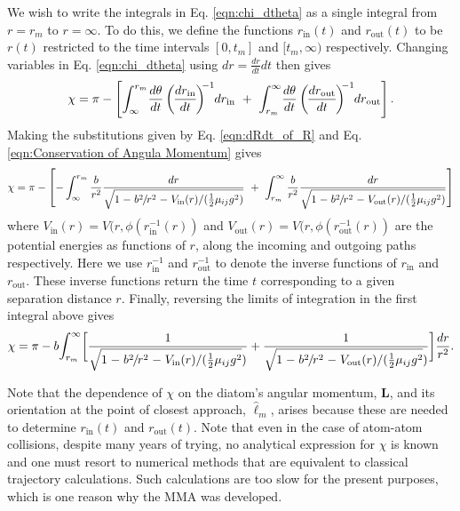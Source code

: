 \documentclass[article]{revtex4-2}
\begin{document}
We wish to write the integrals in Eq. \ref{eqn:chi_dtheta} as a single integral from $r=r_m$ to $r=\infty$. To do this, we define the functions $r_{\text{in}}(t)$ and $r_{\text{out}}(t)$ to be $r(t)$ restricted to the time intervals $[0, t_m]$ and  $[t_m, \infty)$ respectively. Changing variables in Eq. \ref{eqn:chi_dtheta} using $dr = \frac{dr}{dt}dt$ then gives
\begin{equation}
    \chi = \pi - \left[ \int_{\infty}^{r_m}\!\frac{d \theta }{dt}\left(\mkern-2mu \frac{dr_{\text{in}}}{dt}\mkern-2mu \right)^{\!\!-1}\mkern-4mu dr_{\text{in}} \ + \  \int_{r_m}^{\infty}\!\frac{d \theta }{dt}\left(\mkern-2mu \frac{dr_{\text{out}}}{dt}\mkern-2mu \right)^{\!\!-1}\mkern-4mu dr_{\text{out}}\right].
\end{equation}
Making the substitutions given by Eq. \ref{eqn:dRdt_of_R} and Eq. \ref{eqn:Conservation of Angula Momentum} gives
\begin{equation}
    \chi = \pi - \left[ -\int_{\infty}^{r_m} \frac{b}{r^2}\frac{dr}{\sqrt{1 \mkern1mu - \mkern1mu  b^2 \mkern-2mu/\mkern-2mu r^2 \mkern1mu - \mkern1mu V_{\text{in}}(r)/(\frac{1}{2}\mu_{ij} g^2)}} \ + \ \int_{r_m}^{\infty} \frac{b}{r^2}\frac{dr}{\sqrt{1 \mkern1mu - \mkern1mu  b^2 \mkern-2mu/\mkern-2mu r^2 \mkern1mu - \mkern1mu V_{\text{out}}(r)/(\frac{1}{2}\mu_{ij} g^2)}} \right]
\end{equation}
where $V_{\text{in}}(r) = V(r, \phi(r_{\text{in}}^{-1}(r))$ and $V_{\text{out}}(r) = V(r, \phi(r_{\text{out}}^{-1}(r))$ are the potential energies as functions of $r$, along the incoming and outgoing paths respectively. Here we use $r_{\text{in}}^{-1}$ and $r_{\text{out}}^{-1}$ to denote the inverse functions of $r_{\text{in}}$ and $r_{\text{out}}$. These inverse functions return the time $t$ corresponding to    a given separation distance $r$. Finally, reversing the limits of integration in the first integral above gives
\begin{equation}
    \chi = \pi - b \mathlarger{\int}_{r_m}^{\infty} \bigg[ \frac{1}{\sqrt{1 \mkern1mu - \mkern1mu  b^2 \mkern-2mu/\mkern-2mu r^2 \mkern1mu - \mkern1mu V_{\text{in}}(r)/(\frac{1}{2}\mu_{ij} g^2})} + \frac{1}{\sqrt{1 \mkern1mu - \mkern1mu  b^2 \mkern-2mu/\mkern-2mu r^2 \mkern1mu - \mkern1mu V_{\text{out}}(r)/(\frac{1}{2}\mu_{ij} g^2})} \bigg]\frac{dr}{r^2}.
    \label{eqn:final_chi}
\end{equation}

Note that the dependence of $\chi$ on the diatom's angular momentum, $\mathbf{L}$, and its orientation at the point of closest approach, $\widehat{\boldsymbol{\ell}}_m$, arises because these are needed to determine $r_{\text{in}}(t)$ and $r_{\text{out}}(t)$.
Note that even in the case of atom-atom collisions, despite many years of trying, no analytical expression for $\chi$ is known and one must resort to numerical methods that are equivalent to classical trajectory calculations. Such calculations are too slow \cite{skullerud2021} for the present purposes, which is one reason why the MMA was developed.
\end{document}
